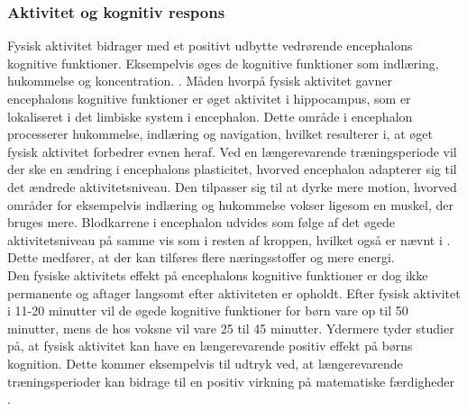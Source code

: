 \subsubsection{Aktivitet og kognitiv respons}
Fysisk aktivitet bidrager med et positivt udbytte vedrørende encephalons kognitive funktioner. Eksempelvis øges de kognitive funktioner som indlæring, hukommelse og koncentration. %
\citep{Berchtold2010,Bugge2015,Schmidt2015}. 
Måden hvorpå fysisk aktivitet gavner encephalons kognitive funktioner er øget aktivitet i hippocampus, som er lokaliseret i det limbiske system i encephalon. Dette område i encephalon processerer hukommelse, indlæring og navigation, hvilket resulterer i, at øget fysisk aktivitet forbedrer evnen heraf. Ved en længerevarende træningsperiode vil der ske en ændring i encephalons plasticitet, hvorved encephalon adapterer sig til det ændrede aktivitetsniveau. Den tilpasser sig til at dyrke mere motion, hvorved områder for eksempelvis indlæring og hukommelse vokser ligesom en muskel, der bruges mere. Blodkarrene i encephalon udvides som følge af det øgede aktivitetsniveau på samme vis som i resten af kroppen, hvilket også er nævnt i . Dette medfører, at der kan tilføres flere næringsstoffer og mere energi. \citep{Cotman2007}\\
Den fysiske aktivitets effekt på encephalons kognitive funktioner er dog ikke permanente og aftager langsomt efter aktiviteten er opholdt. Efter fysisk aktivitet i 11-20 minutter vil de øgede kognitive funktioner for børn vare op til 50 minutter, mens de hos voksne vil vare 25 til 45 minutter. \citep{Cotman2007,Schmidt2015} Ydermere tyder studier på, at fysisk aktivitet kan have en længerevarende positiv effekt på børns kognition. Dette kommer eksempelvis til udtryk ved, at længerevarende træningsperioder kan bidrage til en positiv virkning på matematiske færdigheder \citep{Bugge2015,SibleyEtnier2003}.
